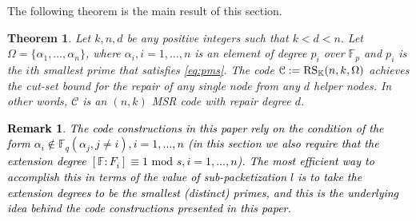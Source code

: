 \documentclass[11pt,onecolumn]{IEEEtran}
\newtheorem{theorem}{Theorem}
\newtheorem{remark}{Remark}
\newcommand{\cC}{\mathcal{C}}
\begin{document}
The following theorem is the main result of this section.
\begin{theorem} \label{thm1} 
Let $k,n,d$ be any positive integers such that $k< d < n.$ Let $\Omega=\{\alpha_1,\dots,\alpha_n\}$, where $\alpha_i,i=1,\dots,n$ is an element of degree $p_i$
over $\mathbb{F}_p$ and $p_i$ is the $i$th smallest prime that satisfies \eqref{eq:pms}.
 The code $\cC:=\text{\rm RS}_{\mathbb{K}}(n,k,\Omega)$ achieves the cut-set bound for the repair of any single node from any $d$ helper nodes.
In other words, $\cC$ is an $(n,k)$ MSR code with repair degree $d$. 
 \end{theorem}
\textcolor{black}{
\begin{remark} The code constructions in this paper rely on the condition of the form $\alpha_i\not \in \mathbb{F}_q(\alpha_j,j\ne i), i=1,\dots,n$ (in this section we also require that the extension degree $[\mathbb{F}:F_i] \equiv 1 \text{~mod~} s, i=1,\dots,n$).
 The most efficient way to accomplish this in terms of the value of sub-packetization $l$ is to take the extension degrees to be
the smallest (distinct) primes, and this is the underlying idea behind the code constructions presented in this paper.
\end{remark}}
\end{document}
